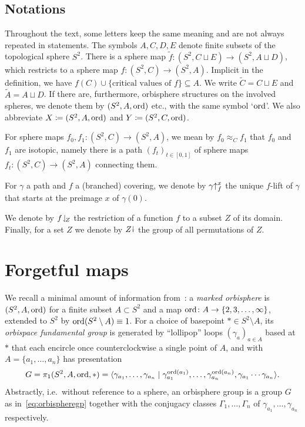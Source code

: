 \documentclass{amsart}
\newcommand\wtf{{\widetilde f}}
\newcommand\wtA{{\widetilde A}}
\newcommand\wtC{{\widetilde C}}
\begin{document}
\subsection{Notations}
Throughout the text, some letters keep the same meaning and are not
always repeated in statements. The symbols $A,C,D,E$ denote finite
subsets of the topological sphere $S^2$. There is a sphere map
$\wtf\colon(S^2,C\sqcup E)\to(S^2,A\sqcup D)$, which restricts to a
sphere map $f\colon(S^2,C)\to(S^2,A)$. Implicit in the definition, we
have $f(C)\cup\{\text{critical values of }f\}\subseteq A$. We write
$\wtC=C\sqcup E$ and $\wtA=A\sqcup D$. If there are,
furthermore, orbisphere structures on the involved spheres, we denote
them by $(S^2,A,\operatorname{ord})$ etc., with the same symbol `$\operatorname{ord}$'. We also
abbreviate $X\coloneqq(S^2,A,\operatorname{ord})$ and $Y\coloneqq(S^2,C,\operatorname{ord})$.

For sphere maps $f_0,f_1\colon(S^2,C)\to(S^2,A)$, we mean by
$f_0\approx_C f_1$ that $f_0$ and $f_1$ are isotopic, namely there is
a path $(f_t)_{t\in[0,1]}$ of sphere maps $f_t\colon(S^2,C)\to(S^2,A)$
connecting them.

For $\gamma$ a path and $f$ a (branched) covering, we denote by
$\gamma{\uparrow}_{f}^{x}$ the unique $f$-lift of $\gamma$ that starts at the
preimage $x$ of $\gamma(0)$.

We denote by $f\!\downharpoonleft_{\!Z}$ the restriction of a function $f$ to a
subset $Z$ of its domain.  Finally, for a set $Z$ we denote by
$Z{\stackrel{\downarrow}{\smash.}}$ the group of all permutations of $Z$.

\section{Forgetful maps}\label{ss:forgetful}
We recall a minimal amount of information
from~\cite{bartholdi-dudko:bc2}: a \emph{marked orbisphere} is
$(S^2,A,\operatorname{ord})$ for a finite subset $A\subset S^2$ and a map
$\operatorname{ord}\colon A\to\{2,3,\dots,\infty\}$, extended to $S^2$ by
$\operatorname{ord}(S^2\setminus A)\equiv1$. For a choice of basepoint
$*\in S^2\setminus A$, its \emph{orbispace fundamental group} is
generated by ``lollipop'' loops $(\gamma_a)_{a\in A}$ based at $*$
that each encircle once counterclockwise a single point of $A$, and
with $A=\{a_1,\dots,a_n\}$ has presentation
\begin{equation}\label{eq:orbispheregp}
  G=\pi_1(S^2,A,\operatorname{ord},*)=\langle \gamma_{a_1},\dots,\gamma_{a_n}\mid \gamma_{a_1}^{\operatorname{ord}(a_1)},\dots,\gamma_{a_n}^{\operatorname{ord}(a_n)}, \gamma_{a_1}\cdots\gamma_{a_n}\rangle.
\end{equation}
Abstractly, i.e.\ without reference to a sphere, an orbisphere group
is a group $G$ as in~\eqref{eq:orbispheregp} together with the
conjugacy classes $\Gamma_1,\dots,\Gamma_n$ of
$\gamma_{a_1},\dots,\gamma_{a_n}$ respectively.
\end{document}
